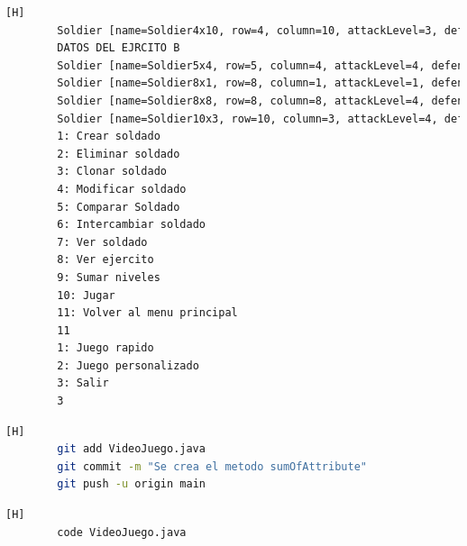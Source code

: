 \documentclass{article}
\begin{document}
\begin{lstlisting}[language=bash,caption={Compilando y probando el metodo sumOfAttributes  }][H]
		Soldier [name=Soldier4x10, row=4, column=10, attackLevel=3, defenseLevel=3, actualLife=5, speed=0, attitude=Repose, current=true]
		DATOS DEL EJRCITO B
		Soldier [name=Soldier5x4, row=5, column=4, attackLevel=4, defenseLevel=3, actualLife=4, speed=0, attitude=Repose, current=true]
		Soldier [name=Soldier8x1, row=8, column=1, attackLevel=1, defenseLevel=4, actualLife=4, speed=0, attitude=Repose, current=true]
		Soldier [name=Soldier8x8, row=8, column=8, attackLevel=4, defenseLevel=4, actualLife=5, speed=0, attitude=Repose, current=true]
		Soldier [name=Soldier10x3, row=10, column=3, attackLevel=4, defenseLevel=2, actualLife=3, speed=0, attitude=Repose, current=true]
		1: Crear soldado
		2: Eliminar soldado
		3: Clonar soldado
		4: Modificar soldado
		5: Comparar Soldado
		6: Intercambiar soldado
		7: Ver soldado
		8: Ver ejercito
		9: Sumar niveles
		10: Jugar
		11: Volver al menu principal
		11
		1: Juego rapido
		2: Juego personalizado
		3: Salir
		3
	\end{lstlisting}
	
	\begin{lstlisting}[language=bash,caption={Commit: ccb448aabe0c75743e18946a8e2965bc9790ce37}][H]
		git add VideoJuego.java
		git commit -m "Se crea el metodo sumOfAttribute"			
		git push -u origin main
	\end{lstlisting}
	
	
	
	
	
	
	
	
	
	
	
	
	
	\begin{lstlisting}[language=bash,caption={Se implementa el método de batalla rápida}][H]
		code VideoJuego.java
	\end{lstlisting}
	
\end{document}

